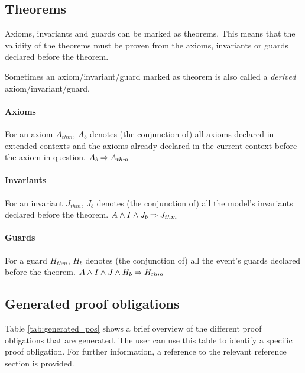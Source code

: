 \subsection{Theorems}
\label{theorems}
Axioms, invariants and guards can be marked as theorems. This means that the validity of the theorems must be proven from the axioms, invariants or guards declared before
  the theorem.

Sometimes an axiom/invariant/guard marked as theorem is also called a \emph{derived} axiom/invariant/guard.

\paragraph{Axioms}
\label{axioms_as_theorems}
For an axiom $A_{thm}$, $A_b$ denotes (the conjunction of) all axioms declared
  in extended contexts and the axioms already declared in
  the current context before the axiom in question.
%
  {$A_b \mathbin\Rightarrow A_{thm}$}

\paragraph{Invariants}
\label{invariants_as_theorems}
For an invariant $J_{thm}$, $J_b$ denotes (the conjunction of) all the model's 
  invariants declared before the theorem.
%
  {$A \land I \land J_b \mathbin\Rightarrow J_{thm}$}

\paragraph{Guards}
\label{guards_as_theorems}
For a guard $H_{thm}$, $H_b$ denotes (the conjunction of) all the event's 
  guards declared before the theorem.
%
  {$A \land I \land J \land H_b \mathbin\Rightarrow H_{thm}$}

\subsection{Generated proof obligations}
\label{generated_proof_obligations}

Table \ref{tab:generated_pos} shows
 a brief overview of the different proof obligations that are generated.
The user can use this table to identify a specific proof obligation. For further information, 
a reference to the relevant reference section is provided.

